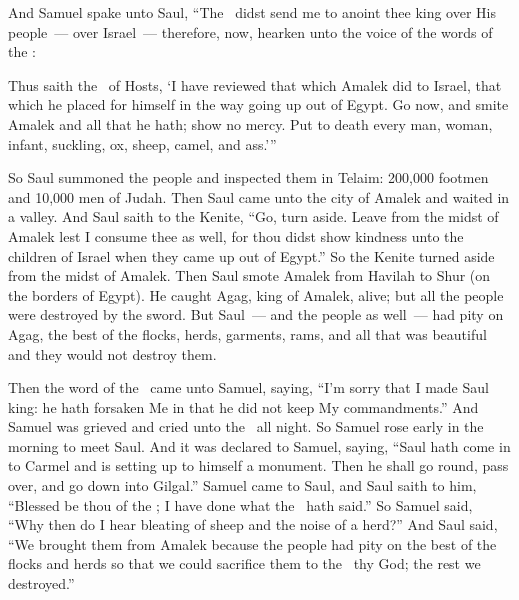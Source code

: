 
\begin{inparaenum}
   And Samuel spake unto Saul, ``The \lord\ didst send me to anoint thee king over His people~--- over Israel~--- therefore, now, hearken unto the voice of the words of the \lord:%
  
   Thus saith the \lord\ of Hosts, `I have reviewed that which Amalek did to Israel, that which he placed for himself in the way going up out of Egypt.%
   Go now, and smite Amalek and all that he hath; show no mercy. Put to death every man, woman, infant, suckling, ox, sheep, camel, and ass.'''%
  
   So Saul summoned the people and inspected them in Telaim: 200,000 footmen and 10,000 men of Judah.%
   Then Saul came unto the city of Amalek and waited in a valley.%
   And Saul saith to the Kenite, ``Go, turn aside. Leave from the midst of Amalek lest I consume thee as well, for thou didst show kindness unto the children of Israel when they came up out of Egypt.'' So the Kenite turned aside from the midst of Amalek.%
   Then Saul smote Amalek from Havilah to Shur (on the borders of Egypt).%
   He caught Agag, king of Amalek, alive; but all the people were destroyed by the sword.%
   But Saul~--- and the people as well~--- had pity on Agag, the best of the flocks, herds, garments, rams, and all that was beautiful and they would not destroy them.%
  
   Then the word of the \lord\ came unto Samuel, saying,%
   ``I'm sorry that I made Saul king: he hath forsaken Me in that he did not keep My commandments.'' And Samuel was grieved and cried unto the \lord\ all night.%
   So Samuel rose early in the morning to meet Saul. And it was declared to Samuel, saying, ``Saul hath come in to Carmel and is setting up to himself a monument. Then he shall go round, pass over, and go down into Gilgal.''%
   Samuel came to Saul, and Saul saith to him, ``Blessed be thou of the \lord; I have done what the \lord\ hath said.''%
   So Samuel said, ``Why then do I hear bleating of sheep and the noise of a herd?''%
   And Saul said, ``We brought them from Amalek because the people had pity on the best of the flocks and herds so that we could sacrifice them to the \lord\ thy God; the rest we destroyed.''%
  

\end{inparaenum}
